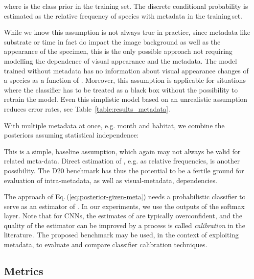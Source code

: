 \documentclass[10pt,twocolumn,letterpaper]{article}
\begin{document}
where  is the class prior in the training set.
The discrete conditional probability  is estimated as the relative frequency of species  with metadata  in the training\,set.


While we know this assumption is not always true in practice, since metadata like substrate or time in fact do impact the image background as well as the appearance of the specimen, 
this is the only possible approach not requiring modelling the dependence of visual appearance and the metadata. 
The model trained without metadata has no information about visual appearance changes of a species as a function of . Moreover, this assumption is applicable for situations where the classifier has to be treated as a black box without the possibility to retrain the model.
Even this simplistic model based on an unrealistic assumption reduces error rates, see
Table~\ref{table:results_metadata}.


With multiple metadata at once, e.g. month and habitat, we combine the posteriors assuming statistical independence:

This is a simple, baseline assumption, which again may not always be valid for related meta-data. Direct estimation of , e.g. as relative frequencies, is another possibility. The D20 benchmark has thus the potential to be a fertile ground for evaluation of intra-metadata, as well as visual-metadata, dependencies.

The approach of Eq.\,(\ref{eq:posterior-given-meta}) needs a probabilistic classifier to serve as an estimator of . In our experiments, we use the outputs of the softmax layer.
Note that for CNNs, the estimates of  are typically overconfident, and the quality of the estimator can be improved by a process is called {\it calibration} in the literature\,\cite{guo2017calibration,vaicenavicius2019evaluating}. 
The proposed benchmark may be used, in the context of exploiting metadata, to evaluate and compare classifier calibration techniques.

\subsection{Metrics}
\label{metrics}
\end{document}
